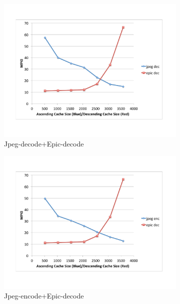 \documentclass{acm_proc_article-sp}
\begin{document}
\begin{figure}
\begin{subfigure}[b]{0.22\textwidth}
    \includegraphics[width=\textwidth]{figs/jpeg-decode+epic-decode.pdf}
    \caption{Jpeg-decode+Epic-decode}
    \label{fig:jpeg-decode-epic-decode}
  \end{subfigure}%
  \begin{subfigure}[b]{0.22\textwidth}
    \includegraphics[width=\textwidth]{figs/jpeg-encode+epic-decode.pdf}
    \caption{Jpeg-encode+Epic-decode}
    \label{fig:jpeg-encode}
  \end{subfigure}
  \begin{subfigure}[b]{0.22\textwidth}

\end{subfigure}
\end{figure}
\end{document}
